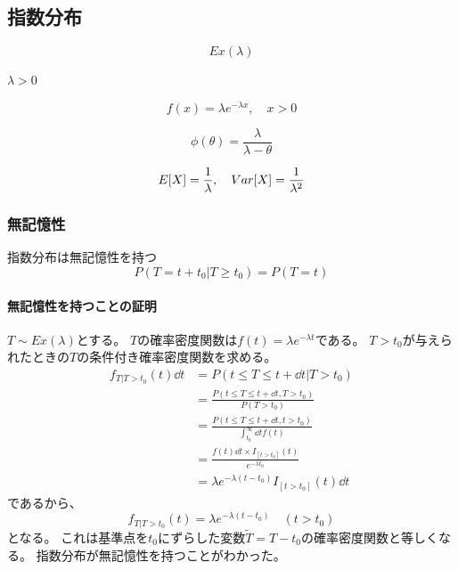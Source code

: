 \subsection{指数分布}


\begin{outline}[description]
  \1 [表記]
  \begin{equation}
    Ex(\lambda)
  \end{equation}
  
  \1 [パラメータ]
  \2
   \(\lambda > 0\)
  
  \1 [密度関数]
  \begin{equation}
    f(x) = \lambda e^{- \lambda x}, \quad x > 0
  \end{equation}
  
  \1 [積率母関数]
  \begin{equation}
    \phi (\theta) = \frac{\lambda}{\lambda - \theta}
  \end{equation}
  
  \1 [期待値・分散]
  \begin{equation}
    E \qty [ X] = \frac{1}{\lambda}, \quad Var \qty [ X ] = \frac{1}{\lambda^2} 
  \end{equation}
\end{outline}

\subsubsection{無記憶性}

指数分布は無記憶性を持つ
\begin{equation} \label{eq:exponential_distribution_memorylessness}
  P(T = t + t_0 | T \geq t_0) = P(T = t)
\end{equation}

\paragraph{無記憶性を持つことの証明}

\(T \sim Ex(\lambda)\)とする。
\(T\)の確率密度関数は\(f(t) = \lambda e^{-\lambda t}\)である。
\(T > t_0\)が与えられたときの\(T\)の条件付き確率密度関数を求める。
\begin{equation}
  \begin{aligned}
    f_{T | T > t_0} (t) \dd{t} &= P( t \leq T \leq t + \dd{t} | T > t_0) \\
    &= \frac{P( t \leq T \leq t + \dd{t} , T > t_0)}{P(T > t_0)}  \\
    &= \frac{P( t \leq T \leq t + \dd{t} , t > t_0)}{\int_{t_0}^{\infty}\dd{t}f(t)} \\
    &= \frac{f(t)\dd{t} \times I_{[t>t_0]}(t)}{e^{-\lambda t_0}} \\
    &= \lambda e^{-\lambda (t - t_0)} I_{[t>t_0]}(t) \dd{t}
  \end{aligned}
\end{equation}
であるから、
\begin{equation}
  f_{T | T > t_0} (t) =  \lambda e^{-\lambda (t - t_0)}  \quad (t > t_0)
\end{equation}
となる。
これは基準点を\(t_0\)にずらした変数\(\tilde{T} = T - t_0\)の確率密度関数と等しくなる。
指数分布が無記憶性を持つことがわかった。

